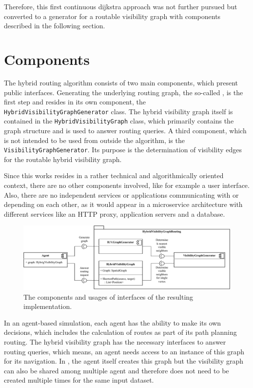 		Therefore, this first continuous dijkstra approach was not further pursued but converted to a generator for a routable visibility graph with components described in the following section.
	
\section{Components}
\label{sec:components}

	The hybrid routing algorithm consists of two main components, which present public interfaces.
	Generating the underlying routing graph, the so-called , is the first step and resides in its own component, the \texttt{HybridVisibilityGraphGenerator} class.
	The hybrid visibility graph itself is contained in the \texttt{HybridVisibilityGraph} class, which primarily contains the graph structure and is used to answer routing queries.
	A third component, which is not intended to be used from outside the algorithm, is the \texttt{VisibilityGraphGenerator}.
	Its purpose is the determination of visibility edges for the routable hybrid visibility graph.
	
	Since this works resides in a rather technical and algorithmically oriented context, there are no other components involved, like for example a user interface.
	Also, there are no independent services or applications communicating with or depending on each other, as it would appear in a microservice architecture with different services like an HTTP proxy, application servers and a database.
	
	\begin{figure}[h]
		\begin{figcenter}
			\includegraphics[width=\textwidth]{images/components.pdf}
		\end{figcenter}
		\caption{The components and usages of interfaces of the resulting implementation.}
		\label{fig:components}
	\end{figure}
	
	In an agent-based simulation, each agent has the ability to make its own decisions, which includes the calculation of routes as part of its path planning routing.
	The hybrid visibility graph has the necessary interfaces to answer routing queries, which means, an agent needs access to an instance of this graph for its navigation.
	In , the agent itself creates this graph but the visibility graph can also be shared among multiple agent and therefore does not need to be created multiple times for the same input dataset.
	
